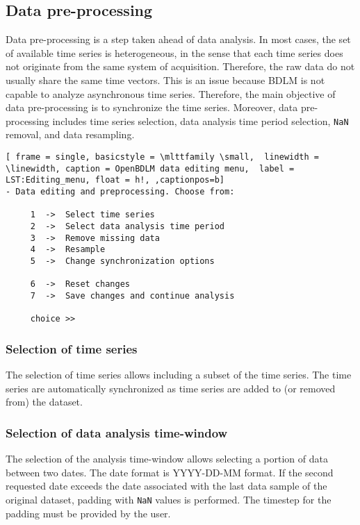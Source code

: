 \subsection{Data pre-processing}
\label{S:DATAEDITINGPREPROCESSING}

Data pre-processing is a step taken ahead of data analysis.
In most cases, the set of available time series is heterogeneous, in the sense that each time series does not originate from the same system of acquisition.
Therefore, the raw data do not usually share the same time vectors.
This is an issue because BDLM is not capable to analyze asynchronous time series.
Therefore, the main objective of data pre-processing is to synchronize the time series. 
Moreover, data pre-processing includes time series selection, data analysis time period selection, \lstinline[basicstyle = \mlttfamily \small ]!NaN! removal, and data resampling.

\begin{lstlisting}[ frame = single, basicstyle = \mlttfamily \small,  linewidth = \linewidth, caption = OpenBDLM data editing menu,  label = LST:Editing_menu, float = h!, ,captionpos=b]
- Data editing and preprocessing. Choose from:

     1  ->  Select time series
     2  ->  Select data analysis time period 
     3  ->  Remove missing data
     4  ->  Resample
     5  ->  Change synchronization options

     6  ->  Reset changes
     7  ->  Save changes and continue analysis

     choice >> 
\end{lstlisting}    

\subsubsection{Selection of time series}
\label{SS:SelectionTimeSeries}

The selection of time series allows including a subset of the time series.
The time series are automatically synchronized as time series are added to (or removed from) the dataset.

\subsubsection{Selection of data analysis time-window}
\label{SS:SelectionPeriodAnalysis}

The selection of the analysis time-window allows selecting a portion of data between two dates.
The date format is \textquotesingle YYYY-DD-MM\textquotesingle {} format.
If the second requested date exceeds the date associated with the last data sample of the original dataset, padding with \lstinline[basicstyle = \mlttfamily \small ]!NaN! values is performed. 
The timestep for the padding must be provided by the user.

